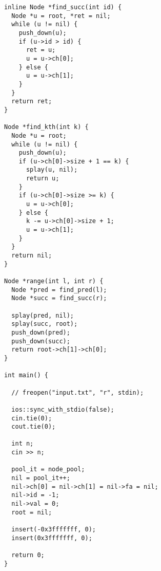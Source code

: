 \documentclass[twoside]{article}
\begin{document}
\begin{lstlisting}
inline Node *find_succ(int id) {
  Node *u = root, *ret = nil;
  while (u != nil) {
    push_down(u);
    if (u->id > id) {
      ret = u;
      u = u->ch[0];
    } else {
      u = u->ch[1];
    }
  }
  return ret;
}

Node *find_kth(int k) {
  Node *u = root;
  while (u != nil) {
    push_down(u);
    if (u->ch[0]->size + 1 == k) {
      splay(u, nil);
      return u;
    }
    if (u->ch[0]->size >= k) {
      u = u->ch[0];
    } else {
      k -= u->ch[0]->size + 1;
      u = u->ch[1];
    }
  }
  return nil;
}

Node *range(int l, int r) {
  Node *pred = find_pred(l);
  Node *succ = find_succ(r);

  splay(pred, nil);
  splay(succ, root);
  push_down(pred);
  push_down(succ);
  return root->ch[1]->ch[0];
}

int main() {

  // freopen("input.txt", "r", stdin);

  ios::sync_with_stdio(false);
  cin.tie(0);
  cout.tie(0);

  int n;
  cin >> n;

  pool_it = node_pool;
  nil = pool_it++;
  nil->ch[0] = nil->ch[1] = nil->fa = nil;
  nil->id = -1;
  nil->val = 0;
  root = nil;

  insert(-0x3fffffff, 0);
  insert(0x3fffffff, 0);

  return 0;
}

\end{lstlisting}
\end{document}
